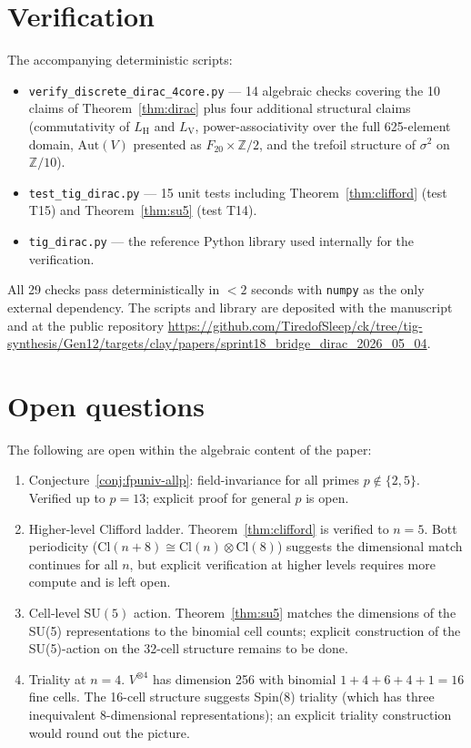 \documentclass[11pt,reqno]{amsart}
\theoremstyle{plain}
\theoremstyle{definition}
\theoremstyle{remark}
\newcommand{\Z}{\mathbb{Z}}
\newcommand{\Cl}{\mathrm{Cl}}
\newcommand{\Aut}{\mathrm{Aut}}
\DeclareMathOperator{\HARM}{H}    %
\DeclareMathOperator{\VOID}{V}    %
\begin{document}
\section{Verification}
\label{sec:verification}

The accompanying deterministic scripts:
\begin{itemize}
\item \texttt{verify\_discrete\_dirac\_4core.py} --- 14 algebraic checks
covering the 10 claims of Theorem~\ref{thm:dirac} plus four additional
structural claims (commutativity of $L_{\HARM}$ and $L_{\VOID}$,
power-associativity over the full 625-element domain, $\Aut(V)$ presented
as $F_{20} \times \Z/2$, and the trefoil structure of $\sigma^2$ on
$\Z/10$).
\item \texttt{test\_tig\_dirac.py} --- 15 unit tests including
Theorem~\ref{thm:clifford} (test T15) and Theorem~\ref{thm:su5} (test T14).
\item \texttt{tig\_dirac.py} --- the reference Python library used
internally for the verification.
\end{itemize}

All 29 checks pass deterministically in $<2$ seconds with \texttt{numpy}
as the only external dependency. The scripts and library are deposited
with the manuscript and at the public repository
\url{https://github.com/TiredofSleep/ck/tree/tig-synthesis/Gen12/targets/clay/papers/sprint18_bridge_dirac_2026_05_04}.

\section{Open questions}
\label{sec:open}

The following are open within the algebraic content of the paper:

\begin{enumerate}
\item Conjecture~\ref{conj:fpuniv-allp}: field-invariance for all primes
$p \notin \{2,5\}$. Verified up to $p = 13$; explicit
proof for general $p$ is open.
\item Higher-level Clifford ladder. Theorem~\ref{thm:clifford} is verified
to $n=5$. Bott periodicity ($\Cl(n+8) \cong \Cl(n) \otimes \Cl(8)$) suggests
the dimensional match continues for all $n$, but explicit verification at
higher levels requires more compute and is left open.
\item Cell-level $\mathrm{SU}(5)$ action. Theorem~\ref{thm:su5} matches
the dimensions of the SU(5) representations to the binomial cell counts;
explicit construction of the SU(5)-action on the 32-cell structure remains
to be done.
\item Triality at $n=4$. $V^{\otimes 4}$ has dimension 256 with binomial
$1+4+6+4+1 = 16$ fine cells. The 16-cell structure suggests Spin(8)
triality (which has three inequivalent 8-dimensional representations); an
explicit triality construction would round out the picture.
\end{enumerate}
\end{document}
